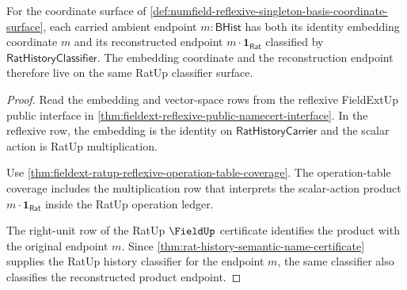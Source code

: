\begin{theorem}
\label{thm:numfield-reflexive-embedding-coordinate-compatibility}
For the coordinate surface of
\autoref{def:numfield-reflexive-singleton-basis-coordinate-surface}, each
carried ambient endpoint $m:\mathsf{BHist}$ has both its identity embedding
coordinate $m$ and its reconstructed endpoint
$m\cdot\mathbf{1}_{\mathsf{Rat}}$ classified by
$\mathsf{RatHistoryClassifier}$. The embedding coordinate and the
reconstruction endpoint therefore live on the same RatUp classifier surface.
\end{theorem}
\begin{proof}
Read the embedding and vector-space rows from the reflexive FieldExtUp public
interface in \autoref{thm:fieldext-reflexive-public-namecert-interface}. In
the reflexive row, the embedding is the identity on
$\mathsf{RatHistoryCarrier}$ and the scalar action is RatUp multiplication.

Use
\autoref{thm:fieldext-ratup-reflexive-operation-table-coverage}. The
operation-table coverage includes the multiplication row that interprets the
scalar-action product $m\cdot\mathbf{1}_{\mathsf{Rat}}$ inside the RatUp
operation ledger.

The right-unit row of the RatUp $\FieldUp$ certificate identifies the product
with the original endpoint $m$. Since
\autoref{thm:rat-history-semantic-name-certificate} supplies the RatUp
history classifier for the endpoint $m$, the same classifier also classifies
the reconstructed product endpoint.
\end{proof}

